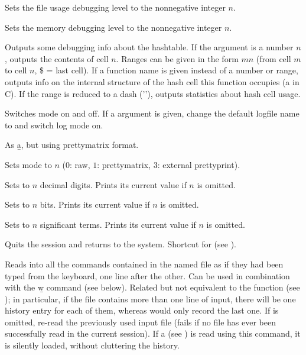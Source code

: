  Sets the file usage debugging level 
to the nonnegative integer $n$.

 Sets the memory debugging level 
to the nonnegative integer $n$.

 Outputs some debugging info about the
hashtable. If the argument is a number $n$, outputs the contents of cell
$n$. Ranges can be given in the form $m$\kbd{-}$n$ (from cell $m$ to cell
$n$, \$ = last cell). If a function name is given instead of a number or
range, outputs info on the internal structure of the hash cell this
function occupies (a  in C). If the range is reduced to
a dash ('\kbd{-}'), outputs statistics about hash cell usage.

 Switches  mode on and off.
If a  argument is given, change the default logfile name to
 and switch log mode on.

 As \b{a}, but using prettymatrix format.

 Sets  mode to $n$ ($0$: raw, $1$:
prettymatrix, $3$: external prettyprint).

 Sets  to $n$ decimal digits.
Prints its current value if $n$ is omitted.

 Sets  to $n$ bits.
Prints its current value if $n$ is omitted.

 Sets  to $n$ significant terms.
Prints its current value if $n$ is omitted.

 Quits the  session and returns to the system.
Shortcut for \kbd{()} (see ).

 Reads into  all the
commands contained in the named file as if they had been typed from the
keyboard, one line after the other. Can be used in combination with the \b{w}
command (see below). Related but not equivalent to the function 
(see ); in particular, if the file contains more than one
line of input, there will be one history entry for each of them, whereas
 would only record the last one. If  is omitted,
re-read the previously used input file (fails if no file has ever been
successfully read in the current session). If a  
(see ) is read using this command, it is silently loaded,
without cluttering the history.


